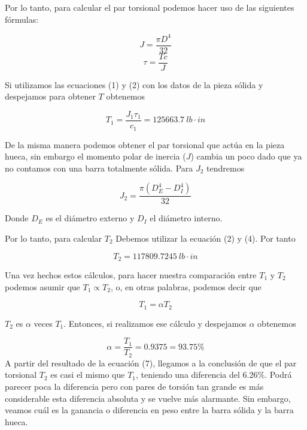 \documentclass[12pt, letterpaper]{article}
\begin{document}
Por lo tanto, para calcular el par torsional podemos hacer uso de las siguientes fórmulas:

\begin{equation}
	J = \frac{\pi D^4}{32}
\end{equation}
\begin{equation}
	\tau = \frac{Tc}{J}
\end{equation}

Si utilizamos las ecuaciones (1) y (2) con los datos de la pieza sólida y despejamos para obtener $T$ obtenemos

\begin{equation}
	T_1 = \frac{J_1 \tau_1}{c_1} = \boxed{125663.7\ lb \cdot in}
\end{equation}

De la misma manera podemos obtener el par torsional que actúa en la pieza hueca, sin embargo el momento polar de inercia ($J$) cambia un poco dado que ya no contamos con una barra totalmente sólida. Para $J_2$ tendremos

\begin{equation}
	J_2 = \frac{\pi (D_E^4 - D_I^4)}{32}
\end{equation}
\begin{center}
	Donde $D_E$ es el diámetro externo y $D_I$ el diámetro interno.
\end{center}

Por lo tanto, para calcular $T_2$ Debemos utilizar la ecuación (2) y (4). Por tanto

\begin{equation}
	\boxed{T_2 = 117809.7245\ lb\cdot in}
\end{equation}

Una vez hechos estos cálculos, para hacer nuestra comparación entre $T_1$ y $T_2$ podemos asumir que $T_1 \propto T_2$, o, en otras palabras, podemos decir que

\begin{equation}
	T_1 = \alpha T_2
\end{equation}

$T_2$ es $\alpha$ veces $T_1$. Entonces, si realizamos ese cálculo y despejamos $\alpha$ obtenemos

\begin{equation}
	\alpha = \frac{T_1}{T_2} = 0.9375 = 93.75 \%
\end{equation}
A partir del resultado de la ecuación (7), llegamos a la conclusión de que el par torsional $T_2$ es casi el mismo que $T_1$, teniendo una diferencia del $6.26\%$. Podrá parecer poca la diferencia pero con pares de torsión tan grande es más considerable esta diferencia absoluta y se vuelve más alarmante. Sin embargo, veamos cuál es la ganancia o diferencia en peso entre la barra sólida y la barra hueca.
\end{document}
